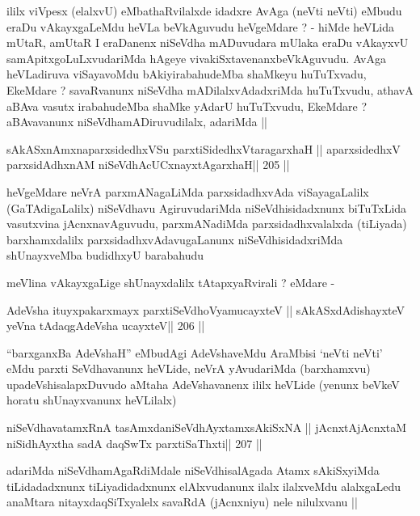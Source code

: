 \begin{artha}
ililx viVpesx (elalxvU) eMbathaRvilalxde idadxre AvAga (neVti neVti)
eMbudu eraDu vAkayxgaLeMdu heVLa beVkAguvudu heVgeMdare ? - hiMde
heVLida mUtaR, amUtaR I eraDanenx niSeVdha mADuvudara mUlaka eraDu
vAkayxvU samApitxgoLuLxvudariMda hAgeye
vivakiSxtavenanxbeVkAguvudu. AvAga heVLadiruva viSayavoMdu
bAkiyirabahudeMba shaMkeyu huTuTxvadu, EkeMdare ? savaRvanunx niSeVdha
mADilalxvAdadxriMda huTuTxvudu, athavA aBAva vasutx irabahudeMba
shaMke yAdarU huTuTxvudu, EkeMdare ? aBAvavanunx
niSeVdhamADiruvudilalx, adariMda ||
\end{artha}

\begin{shl}
sAkASxnAmxnaparxsidedhxVSu parxtiSidedhxVtaragarxhaH ||
aparxsidedhxV parxsidAdhxnAM niSeVdhAcUCxnayxtAgarxhaH\hfill || 205 ||
\end{shl}

\begin{artha}
heVgeMdare neVrA parxmANagaLiMda parxsidadhxvAda viSayagaLalilx
(GaTAdigaLalilx) niSeVdhavu AgiruvudariMda niSeVdhisidadxnunx
biTuTxLida vasutxvina jAcnxnavAguvudu, parxmANadiMda
parxsidadhxvalalxda (tiLiyada) barxhamxdalilx
parxsidadhxvAdavugaLanunx niSeVdhisidadxriMda shUnayxveMba budidhxyU
barabahudu

meVlina vAkayxgaLige shUnayxdalilx tAtapxyaRvirali ? eMdare -
\end{artha}

\begin{shl}
AdeVsha ituyxpakarxmayx parxtiSeVdhoV\s yamucayxteV ||
sAkASxdAdishayxteV yeVna tAdaqgAdeVsha ucayxteV\hfill || 206 ||
\end{shl}

\begin{artha}
``barxganxBa AdeVshaH'' eMbudAgi AdeVshaveMdu AraMbisi `neVti neVti'
  eMdu parxti SeVdhavanunx heVLide, neVrA yAvudariMda (barxhamxvu)
  upadeVshisalapxDuvudo aMtaha AdeVshavanenx ililx heVLide (yenunx
  beVkeV horatu shUnayxvanunx heVLilalx)
\end{artha}

\begin{shl}
niSeVdhavatamxRnA tasAmxdaniSeVdhAyxtamxsAkiSxNA ||
jAcnxtAjAcnxtaM niSidhAyxtha sadA daqSwTx parxtiSaThxti\hfill || 207 ||
\end{shl}

\begin{artha}
adariMda niSeVdhamAgaRdiMdale niSeVdhisalAgada Atamx sAkiSxyiMda
tiLidadadxnunx tiLiyadidadxnunx elAlxvudanunx ilalx ilalxveMdu
alalxgaLedu anaMtara nitayxdaqSiTxyalelx savaRdA (jAcnxniyu) nele
nilulxvanu ||
\end{artha}

